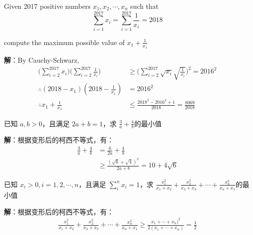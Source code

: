 \documentclass[12pt]{article}
\begin{document}
\begin{framed}
Given 2017 positive numbers $x_1, x_2, \cdots, x_n$ such that
$$
\sum_{i=1}^{2017} x_i = \sum_{i=1}^{2017}{\frac{1}{x_i}} = 2018
$$

compute the maximum possible value of $x_1 + \frac{1}{x_1}$

\textbf{解}：By Cauchy-Schwarz,
\begin{align*}
\Big(\sum_{i=2}^{2017} x_i\Big)\Big(\sum_{i=2}^{2017} \frac{1}{x_i}\Big) &\ge \Big(\sum_{i=2}^{2017}\sqrt{x_i}\sqrt{\frac{1}{x_i}}\Big)^2 = 2016^2 \\
\therefore (2018 - x_1)(2018 - \frac{1}{x_1}) &= 2016^2 \\
\therefore x_1 + \frac{1}{x_1} &\le \frac{2018^2-2016^2+1}{2018} = \frac{8069}{2018}
\end{align*}

\end{framed}

\begin{framed}
已知 $a,b > 0$，且满足 $2a+b=1$，求 $\frac{3}{a}+\frac{4}{b}$的最小值

\textbf{解}：根据变形后的柯西不等式，有：
\begin{align*}
\frac{3}{a}+\frac{4}{b} &= \frac{6}{2a}+\frac{4}{b}\\
&\ge \frac{(\sqrt{6} + \sqrt{4})^2}{2a + b} = 10 + 4\sqrt{6}
\end{align*}
\end{framed}

\begin{framed}
已知 $x_i > 0, i = 1, 2, \cdots, n$，且满足 $\sum_i^nx_i = 1$，求 $\frac{x_1^2}{x_1 + x_2} + \frac{x_2^2}{x_2 + x_3} + \cdots + \frac{x_n^2}{x_n + x_1}$的最小值

\textbf{解}：根据变形后的柯西不等式，有：
\begin{align*}
\frac{x_1^2}{x_1 + x_2} + \frac{x_2^2}{x_2 + x_3} + \cdots + \frac{x_n^2}{x_n + x_1} \ge \frac{x_1 + \cdots + x_n)^2}{2(x_1+\cdots+x_n)} = \frac{1}{2}
\end{align*}
\end{framed}
\end{document}
